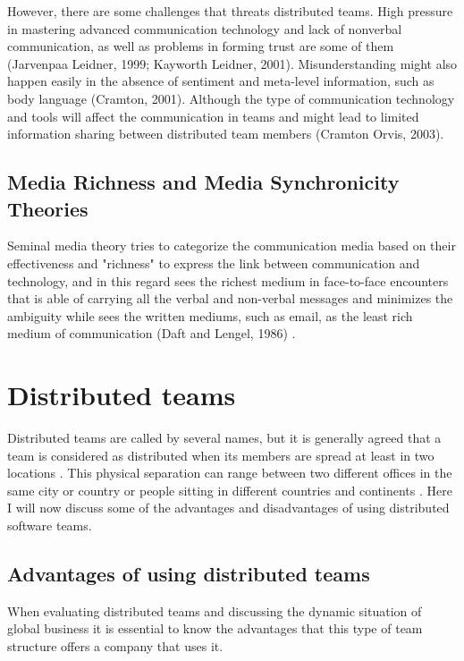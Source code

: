 However, there are some challenges that threats distributed teams. High pressure in mastering advanced communication technology and lack of nonverbal communication, as well as problems in forming trust are some of them (Jarvenpaa  Leidner, 1999; Kayworth  Leidner, 2001). Misunderstanding might also happen easily in the absence of sentiment and meta-level information, such as body language (Cramton, 2001). Although the type of communication technology and tools will affect the communication in teams and might lead to limited information sharing between distributed team members (Cramton  Orvis, 2003).

\subsection{Media Richness and Media Synchronicity Theories}
Seminal media theory tries to categorize the communication media based on their effectiveness and "richness" to express the link between communication and technology, and in this regard sees the richest medium in face-to-face encounters that is able of carrying all the verbal and non-verbal messages and minimizes the ambiguity while sees the written mediums, such as email, as the least rich medium of communication (Daft and Lengel, 1986) \citep{Hassell2016}.



\section{Distributed teams} \label{dt}
Distributed teams are called by several names, but it is generally agreed that a team is considered as distributed when its members are spread at least in two locations \citep{Hinds2005}. This physical separation can range between two different offices in the same city or country or people sitting in different countries and continents \citep{Mortensen2001}. Here I will now discuss some of the advantages and disadvantages of using distributed software teams.
\subsection{Advantages of using distributed teams}
When evaluating distributed teams and discussing the dynamic situation of global business it is essential to know the advantages that this type of team structure offers a company that uses it. 


